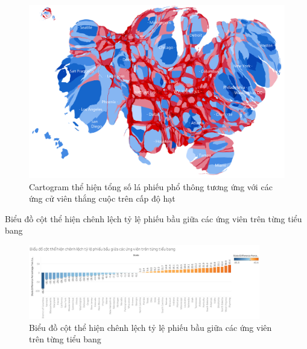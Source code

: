 \documentclass[10pt]{beamer}
\theoremstyle{remark}
\theoremstyle{definition}
\begin{document}
\begin{frame}
	\begin{figure}[h!]
        \centering
        \includegraphics[width=\textwidth]{figures/County_Total_Vote_Cartogram.png}
        \caption{Cartogram thể hiện tổng số lá phiếu phổ thông tương ứng với các ứng cử viên thắng cuộc trên cấp độ hạt}
    \end{figure}
\end{frame}

\begin{frame}{Biểu đồ cột thể hiện chênh lệch tỷ lệ phiếu bầu giữa các ứng viên trên từng tiểu bang}
	\begin{figure}[h!]
		\centering
		\includegraphics[width=0.9\textwidth]{figures/State_Difference_Percentage_Total_Vote_Two_Candidate_Bar_Chart.png}
		\caption{Biểu đồ cột thể hiện chênh lệch tỷ lệ phiếu bầu giữa các ứng viên trên từng tiểu bang}
	\end{figure}
\end{frame}
\end{document}
